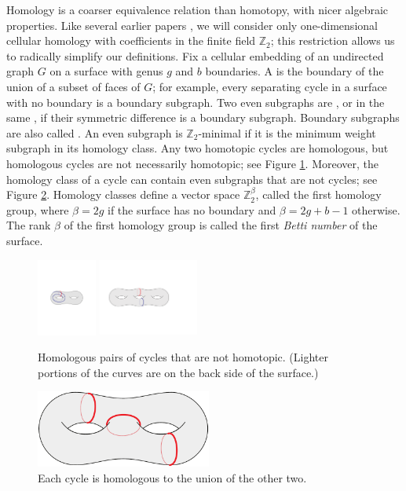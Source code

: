 \documentclass[letterpaper,review]{siamart190516}
\def\Z{\mathbb{Z}}
\def\modified#1{\color{blue}#1 \color{black}}
\begin{document}
Homology is a coarser equivalence relation than homotopy, with nicer
algebraic properties.  Like several earlier papers \cite{cf-qhc2-07,
cf-qhc-08, dls-chtl-07, dlsc-cgaht-08,e-sncds-11,f-sntcd-13}, we will consider only
one-dimensional cellular homology with coefficients in the finite
field $\Z_2$; this restriction allows us to radically simplify our
definitions.
Fix a cellular embedding of an undirected graph $G$ on a surface with genus $g$ and $b$ boundaries.  A  is the boundary of the union of a subset of faces of $G$; for example, every separating cycle \modified{in a surface with no boundary} is a boundary subgraph.
Two even subgraphs are , or in the same , if their symmetric difference is a boundary subgraph.
Boundary subgraphs are also called .  \modified{An even subgraph is $\Z_2$-minimal if it is the minimum weight subgraph in its homology class.} Any two homotopic cycles are homologous, but homologous cycles are not necessarily homotopic; see Figure \ref{fig:homology}.  Moreover, the homology class of a cycle can contain even subgraphs that are not cycles; see Figure \ref{fig:homology2}.
Homology classes define a vector space $\Z_2^\beta$, called the first homology group, where $\beta = 2g$ if the surface has no boundary and $\beta = 2g+b-1$ otherwise.
The rank $\beta$ of the first homology group is called the first \emph{Betti number} of the surface.

\begin{figure}[htb]
\centering
\includegraphics[height=1in]{Fig/homologous3}\qquad
\includegraphics[height=1in]{Fig/homologous2}
\caption{Homologous pairs of cycles that are not homotopic.  (Lighter portions of the curves are on the back side of the surface.)}
\label{fig:homology}
\end{figure}

\begin{figure}[htb]
\centering
\includegraphics[height=1in]{Fig/homologous1}
\caption{Each cycle is homologous to the union of the other two.}
\label{fig:homology2}
\end{figure}
\end{document}
